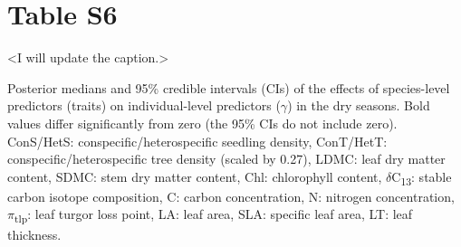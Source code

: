 \documentclass[
  12pt,
  letterpaper,
  DIV=11,
  numbers=noendperiod]{scrartcl}
\begin{document}
\newpage

\hypertarget{table-s6}{%
\section{Table S6}\label{table-s6}}

\textless I will update the caption.\textgreater{}

Posterior medians and 95\% credible intervals (CIs) of the effects of
species-level predictors (traits) on individual-level predictors
(\(\gamma\)) in the dry seasons. Bold values differ significantly from
zero (the 95\% CIs do not include zero). ConS/HetS:
conspecific/heterospecific seedling density, ConT/HetT:
conspecific/heterospecific tree density (scaled by 0.27), LDMC: leaf dry
matter content, SDMC: stem dry matter content, Chl: chlorophyll content,
\(\delta\)C\textsubscript{13}: stable carbon isotope composition, C:
carbon concentration, N: nitrogen concentration,
\(\pi\)\textsubscript{tlp}: leaf turgor loss point, LA: leaf area, SLA:
specific leaf area, LT: leaf thickness.
\end{document}
